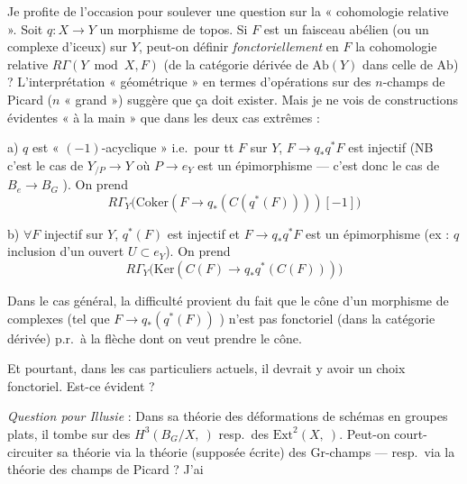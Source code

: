 \documentclass[11pt,a4paper]{article}
\begin{document}
Je profite de l'occasion pour soulever une question sur la « cohomologie
relative ». Soit $q : X \to Y$ un morphisme de topos. Si $F$ est un faisceau
abélien (ou un complexe d'iceux) sur $Y$, peut-on définir
\emph{fonctoriellement} en $F$ la cohomologie relative $R\Gamma(Y \bmod X,
F)$ (de la catégorie dérivée de $\mathrm{Ab}(Y)$ dans celle de
$\mathrm{Ab}$) ? L'interprétation « géométrique » en termes d'opérations
sur des $n$-champs de Picard ($n$ « grand ») suggère que ça doit exister.
Mais je ne vois de constructions évidentes « à la main » que dans les deux
cas extrêmes :

a) $q$ est « $(-1)$-acyclique » i.e.\ pour tt $F$ sur $Y$, $F \to q_* q^* F$
est injectif (NB c'est le cas de $Y_{/P} \to Y$ où $P \to e_Y$ est un
épimorphisme --- c'est donc le cas de $B_e \to B_G$ ).
On prend
\[ R\Gamma_Y\bigl(\mathrm{Coker}(F \to q_*(C(q^*(F))))[-1]\bigr) \]


b) $\forall F$ injectif sur $Y$, $q^*(F)$ est injectif et $F \to q_* q^* F$
est un épimorphisme (ex : $q$ inclusion d'un ouvert $U \subset e_Y$). On
prend
\[ R\Gamma_Y\bigl(\mathrm{Ker}(C(F) \to q_* q^*(C(F)))\bigr) \]


Dans le cas général, la difficulté provient du fait que le cône d'un
morphisme de complexes (tel que
$F \to q_*(q^*(F))$ \struck{\ill{}} )
n'est pas fonctoriel (dans la catégorie dérivée) p.r.\ à la flèche dont on
veut prendre le cône.

Et pourtant, dans les cas particuliers actuels, il devrait y avoir un choix
fonctoriel. Est-ce évident ?

\emph{Question pour Illusie} : Dans sa théorie des déformations de schémas
en groupes plats, il tombe sur des $H^3(B_G/X,\ )$ resp.\ des
$\mathrm{Ext}^2(X,\ )$. Peut-on court-circuiter sa théorie via la théorie
(supposée écrite) des Gr-champs --- resp.\ via la théorie des champs de
Picard ? J'ai

\end{document}
